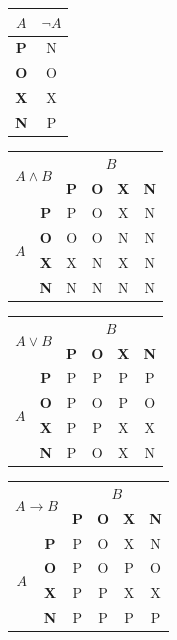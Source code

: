 \documentclass[a4paper, 11pt]{article}
\begin{document}
\begin{center}
\begin{tabular}{|c|c|}
\hline
	$A$ 	& $\neg A$ 	\\ \hline 
	\bf P 	& N 		\\ \hline
	\bf O 	& O 		\\ \hline 
	\bf X 	& X 		\\ \hline 
	\bf N 	& P 		\\ \hline
\end{tabular}
\begin{tabular}{|c|c|c|c|c|c|}
\hline
	\multicolumn{2}{|c|}{\multirow{2}{*}{$A \wedge B$}} 	& \multicolumn{4}{|c|}{$B$} 				\\ \cline{3-6} 
	\multicolumn{2}{|c|}{} 						& \bf P 	& \bf O 	& \bf X 	& \bf N 	\\ \hline
	\multirow{4}{*}{$A$} 				& \bf P 	& P 		& O 		& X 		& N 		\\ \cline{2-6} 
								& \bf O 	& O 		& O 		& N 		& N 		\\ \cline{2-6} 
	 							& \bf X 	& X 		& N 		& X 		& N 		\\ \cline{2-6}
	 							& \bf N 	& N 		& N 		& N 		& N 		\\ \hline
\end{tabular}
\begin{tabular}{|c|c|c|c|c|c|}
\hline
	\multicolumn{2}{|c|}{\multirow{2}{*}{$A \vee B$}} 		& \multicolumn{4}{|c|}{$B$} 				\\ \cline{3-6} 
	\multicolumn{2}{|c|}{} 						& \bf P 	& \bf O 	& \bf X 	& \bf N 	\\ \hline
	\multirow{4}{*}{$A$} 				& \bf P 	& P 		& P 		& P 		& P 		\\ \cline{2-6} 
								& \bf O 	& P 		& O 		& P 		& O 		\\ \cline{2-6} 
	 							& \bf X 	& P 		& P 		& X 		& X 		\\ \cline{2-6}
	 							& \bf N 	& P 		& O 		& X 		& N 		\\ \hline
\end{tabular}
\begin{tabular}{|c|c|c|c|c|c|}
\hline
	\multicolumn{2}{|c|}{\multirow{2}{*}{$A \rightarrow B$}} 	& \multicolumn{4}{|c|}{$B$} 				\\ \cline{3-6} 
	\multicolumn{2}{|c|}{} 						& \bf P 	& \bf O 	& \bf X 	& \bf N 	\\ \hline
	\multirow{4}{*}{$A$} 				& \bf P 	& P 		& O 		& X 		& N 		\\ \cline{2-6} 
								& \bf O 	& P 		& O 		& P 		& O 		\\ \cline{2-6} 
	 							& \bf X 	& P 		& P 		& X 		& X 		\\ \cline{2-6}
	 							& \bf N 	& P 		& P 		& P		& P 		\\ \hline
\end{tabular}
\end{center}
\end{document}
